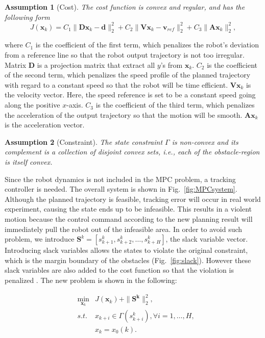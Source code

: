 \documentclass[letterpaper, 10 pt, conference]{ieeeconf}  %
\newtheorem{assumption}{Assumption}
\begin{document}
\begin{assumption}[Cost]
The cost function is convex and regular, and has the following form
\begin{equation}
J(\mathbf{x}_k) = C_1\|\mathbf{D}\mathbf{x}_k-\mathbf{d}\|_{2}^2 + C_2 \|\mathbf{V}\mathbf{x}_k-\mathbf{v}_{ref}\|_2^2 +C_3\|\mathbf{A}\mathbf{x}_{k}\|_2^2,  
\end{equation}
\end{assumption}
where $C_1$ is the coefficient of the first term, which penalizes the robot's deviation from a reference line so that the robot output trajectory is not too irregular. Matrix $\mathbf{D}$ is a projection matrix that extract all $y$'s from $\mathbf{x}_k$. $C_2$ is the coefficient of the second term, which penalizes the speed profile of the planned trajectory with regard to a constant speed so that the robot will be time efficient. $\mathbf{V}\mathbf{x}_k$ is the velocity vector. Here, the speed reference is set to be a constant speed going along the positive $x$-axis. $C_3$ is the coefficient of the third term, which penalizes the acceleration of the output trajectory so that the motion will be smooth. $\mathbf{A}\mathbf{x}_{k}$ is the acceleration vector.

\begin{assumption}[Constraint]
The state constraint $\Gamma$ is non-convex and its complement is a collection of disjoint convex sets, i.e., each of the obstacle-region is itself convex.
\end{assumption}

Since the robot dynamics is not included in the MPC problem, a tracking controller is needed. The overall system is shown in Fig.~\ref{fig:MPCsystem}. Although the planned trajectory  is feasible, tracking error will occur in real world experiment, causing the state ends up to be infeasible. This results in a violent motion because the control command according to the new planning result will immediately pull the robot out of the infeasible area. In order to avoid such problem, we introduce  $\mathbf{S}^k = [s^k_{k+1},s^k_{k+2},\ldots,s^k_{k+H}]$, the slack variable vector. Introducing slack variables allows the states to violate the original constraint, which is the margin boundary of the obstacles (Fig.~\ref{fig:slack}). However these slack variables are also added to the cost function so that the violation is penalized \cite{chen2018foad}. The new problem is shown in the following:

\begin{eqnarray}
&\min_{\mathbf{x}_{k}} & J(\mathbf{x}_k) + \|\mathbf{S^k}\|_{2}^2 ,\\
&s.t.& x_{k+i} \in\Gamma(s^k_{k+i}),\forall i=1,\ldots,H,\\
&&         x_{k}=x_0(k).
\end{eqnarray} 
\end{document}
